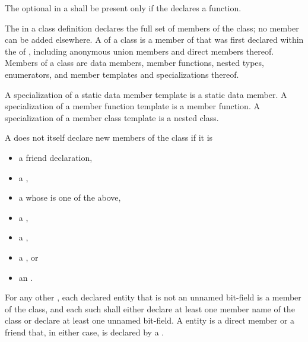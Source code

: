\pnum
The optional 
in a 
shall be present only if
the  declares a function.

\pnum
{}%
The  in a class definition declares the
full set of members of the class; no member can be added elsewhere.
A  of a class  is a member of 
that was first declared within the  of ,
including anonymous union members and direct members thereof.
Members of a class are data members, member
functions, nested types, enumerators,
and member templates and specializations thereof.
\begin{note}
A specialization of a static data member template is a static data member.
A specialization of a member function template is a member function.
A specialization of a member class template is a nested class.
\end{note}

\pnum
A  does not itself declare new members of the class
if it is
\begin{itemize}
\item a friend declaration,
\item a ,
\item a  whose  is one of the above,
\item a ,
\item a ,
\item a , or
\item an .
\end{itemize}
For any other ,
each declared entity
that is not an unnamed bit-field
is a member of the class,
and each such 
shall either
declare at least one member name of the class
or declare at least one unnamed bit-field.
A 
entity is a direct member or a friend that, in either case,
is declared by a .

